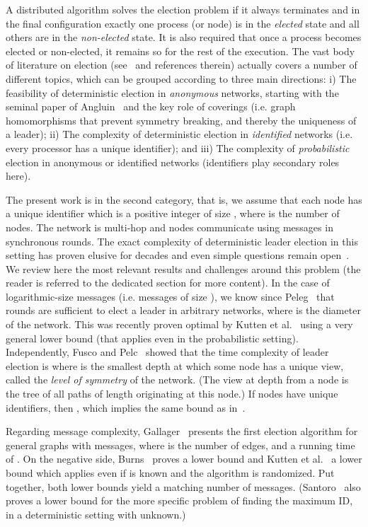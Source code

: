 \documentclass[11pt,envcountsame,letterpaper]{llncs}
\begin{document}
A distributed algorithm solves the
election problem if it always terminates and in the final
configuration exactly one process (or node) is in the \emph{elected} state 
and all
others are in the \emph{non-elected} state. It is also required that 
once a process becomes elected or non-elected, it remains so for the rest of the execution.
The vast body of literature on election (see~\cite{Attiya,Lynch,Santoro,Tel} and references therein) actually covers a number of different topics, which can be grouped according to three main directions: i) The feasibility of deterministic election in {\em anonymous} networks, starting with the seminal paper of Angluin~\cite{Angluin} and the key role of coverings (i.e. graph homomorphisms that prevent symmetry breaking, and thereby the uniqueness of a leader); ii) The complexity of deterministic election in {\em identified} networks (i.e. every processor has a unique identifier); and iii) The complexity of {\em probabilistic} election in anonymous or identified networks (identifiers play secondary roles here).



The present work is in the second category, that is, we assume that each node has a unique identifier which is a positive integer of size , where  is the number of nodes. The network is multi-hop and nodes communicate using messages in synchronous rounds.
The exact complexity of deterministic leader election in this setting has proven elusive for decades and even simple questions remain open~\cite{KPPRT15}. We review here the most relevant results and challenges around this problem (the reader is referred to the dedicated section for more content).
In the case of logarithmic-size messages (i.e. messages of size ), we know since Peleg~\cite{Peleg90} that  rounds are sufficient to elect a leader in arbitrary networks, where  is the diameter of the network.
This was recently proven optimal by Kutten et al.~\cite{KPPRT15}
using a very general  lower bound (that applies even in the probabilistic setting). Independently, Fusco and Pelc~\cite{FP15} showed that the 
time complexity
of leader election is
 where  is the smallest depth at which some node has a unique view, called the {\em level of symmetry} of the network. (The view at depth  from a node is the tree of all paths
of length  originating at this node.) If nodes have unique identifiers, then , which implies the same  bound as in~\cite{KPPRT15}.

Regarding message complexity, 
Gallager~\cite{Gallager} presents
 the first election 
algorithm for general graphs with  messages, 
where  is the number of edges, and a running time of .
On the negative side, Burns~\cite{burns1980} proves a  lower bound and Kutten et al.~\cite{KPPRT15} a  lower bound which applies even if  is known and the algorithm is randomized. Put together, both lower bounds yield a matching  number of messages. (Santoro~\cite{Santoro84} also proves a  lower bound for the more specific problem of finding the maximum ID, in a deterministic setting with  unknown.)
\end{document}
